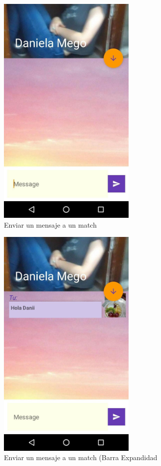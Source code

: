 \documentclass[10pt,letterpaper,extrafontsizes]{memoir}
\begin{document}
\begin{figure}[H]
    \centering
\includegraphics[width=0.6\textwidth]{graficos/capturas/w}
    \caption{Enviar un mensaje a un match}
    \label{fig:charSend}
\end{figure}

\begin{figure}[H]
    \centering
\includegraphics[width=0.6\textwidth]{graficos/capturas/x}
    \caption{Enviar un mensaje a un match (Barra Expandidad}
    \label{fig:exp}
\end{figure}
\end{document}

